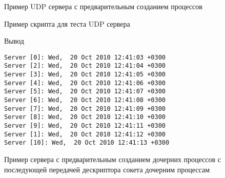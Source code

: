 \begin{frame}[fragile]
{Пример UDP сервера с предварительным созданием процессов}
	\tiny
\end{frame}


\begin{frame}[fragile]
{Пример скрипта для теста UDP сервера}
	\scriptsize
\end{frame}

\begin{frame}[fragile]
{Вывод}
	\scriptsize
	\begin{verbatim}
Server [0]: Wed,  20 Oct 2010 12:41:03 +0300
Server [2]: Wed,  20 Oct 2010 12:41:04 +0300
Server [3]: Wed,  20 Oct 2010 12:41:05 +0300
Server [4]: Wed,  20 Oct 2010 12:41:06 +0300
Server [5]: Wed,  20 Oct 2010 12:41:07 +0300
Server [6]: Wed,  20 Oct 2010 12:41:08 +0300
Server [7]: Wed,  20 Oct 2010 12:41:09 +0300
Server [8]: Wed,  20 Oct 2010 12:41:10 +0300
Server [9]: Wed,  20 Oct 2010 12:41:11 +0300
Server [1]: Wed,  20 Oct 2010 12:41:12 +0300
Server [10]: Wed,  20 Oct 2010 12:41:13 +0300
	\end{verbatim}
\end{frame}


\begin{frame}[fragile]
{Пример сервера с предварительным созданием дочерних процессов с последующей передачей дескриптора сокета дочерним процессам}
	\tiny
\end{frame}


\begin{frame}[fragile]
	\tiny
\end{frame}

\begin{frame}[fragile]
	\tiny
\end{frame}

\begin{frame}[fragile]
	\tiny
\end{frame}

\begin{frame}[fragile]
	\tiny
\end{frame}

